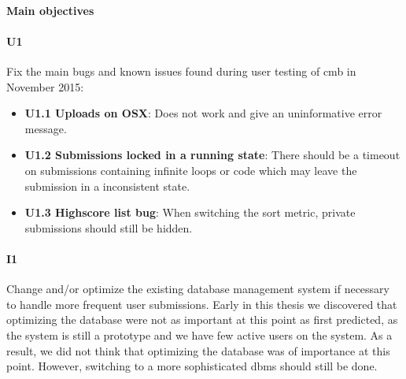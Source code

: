 \paragraph*{Main objectives} \hfill

\paragraph*{U1} Fix the main bugs and known issues found during user testing of \gls{cmb} in November 2015:
  \begin{itemize}
    \item \textbf{U1.1 Uploads on OSX}: Does not work and give an uninformative error message.
    \item \textbf{U1.2 Submissions locked in a running state}: There should be a timeout on submissions containing infinite loops or code which may leave the submission in a inconsistent state.
    \item \textbf{U1.3 Highscore list bug}: When switching the sort metric, private submissions should still be hidden.
  \end{itemize}

\paragraph*{I1} Change and/or optimize the existing database management system if necessary to handle more frequent user submissions. Early in this thesis we discovered that optimizing the database were not as important at this point as first predicted, as the system is still a prototype and we have few active users on the system. As a result, we did not think that optimizing the database was of importance at this point. However, switching to a more sophisticated \gls{dbms} should still be done.

